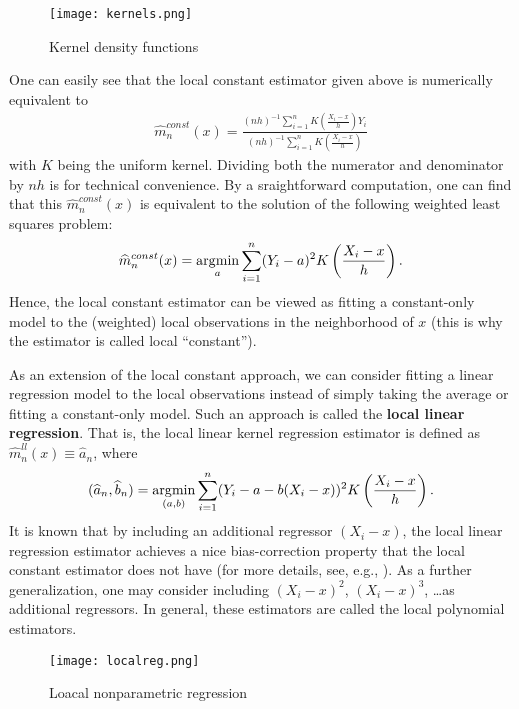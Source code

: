 \documentclass[11pt, A4paper, openany, uplatex]{book}
\begin{document}
\begin{figure}[h!]
	\begin{center}
		\texttt{[image: kernels.png]}
		\caption{Kernel density functions}\label{fig:kernels}
	\end{center}
\end{figure}

One can easily see that the local constant estimator given above is numerically equivalent to
\begin{align*}
	\hat m^{const}_n(x) = \frac{(nh)^{-1}\sum_{i = 1}^n K\left( \frac{X_i - x}{h}\right) Y_i}{(nh)^{-1}\sum_{i = 1}^n K\left( \frac{X_i - x}{h}\right)}
\end{align*}
with $K$ being the uniform kernel.
Dividing both the numerator and denominator by $nh$ is for technical convenience.
By a sraightforward computation, one can find that this $\hat m^{const}_n(x)$ is equivalent to the solution of the following weighted least squares problem:
\begin{align*}
	\widehat m^{const}_n(x) = \operatorname*{\arg\!\min}_a \sum_{i = 1}^n (Y_i - a)^2K\left( \frac{X_i - x}{h}\right).
\end{align*}
Hence, the local constant estimator can be viewed as fitting a constant-only model to the (weighted) local observations in the neighborhood of $x$ (this is why the estimator is called local ``constant'').

As an extension of the local constant approach, we can consider fitting a linear regression model to the local observations instead of simply taking the average or fitting a constant-only model.
Such an approach is called the \textbf{local linear regression}.
That is, the local linear kernel regression estimator is defined as $\hat m^{ll}_n(x) \equiv \hat a_n$, where
\begin{align*}
	(\widehat a_n, \widehat b_n) = \operatorname*{\arg\!\min}_{(a, b)} \sum_{i = 1}^n (Y_i - a - b (X_i -x))^2K\left( \frac{X_i - x}{h}\right).
\end{align*}
It is known that by including an additional regressor $(X_i - x)$, the local linear regression estimator achieves a nice bias-correction property that the local constant estimator does not have (for more details, see, e.g., \cite{li2007nonparametric}).
As a further generalization, one may consider including $(X_i - x)^2$, $(X_i - x)^3$, \ldots as additional regressors.
In general, these estimators are called the local polynomial estimators.

\begin{figure}[h!]
	\begin{center}
		\texttt{[image: localreg.png]}
		\caption{Loacal nonparametric regression}
	\end{center}
\end{figure}
\end{document}
